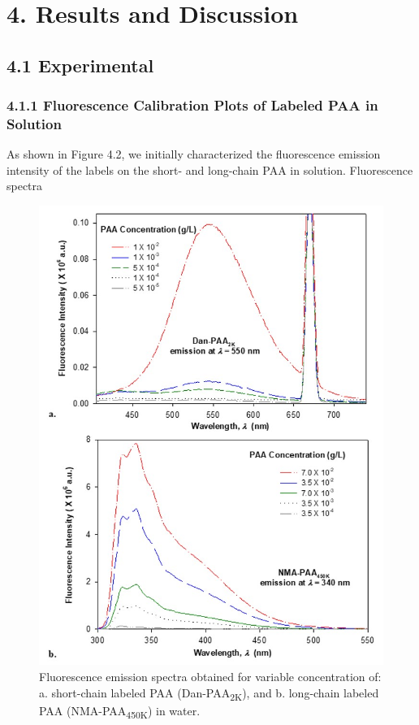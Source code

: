 \documentclass[journal=mamobx,manuscript=article]{achemso}
\begin{document}
\section{4. Results and Discussion}

\subsection{4.1 Experimental}

\subsubsection{4.1.1 Fluorescence Calibration Plots of Labeled PAA in Solution}

As shown in Figure 4.2, we initially characterized the fluorescence emission intensity of the labels on the short- and long-chain PAA in solution.  Fluorescence spectra

\begin{figure}[H]
\includegraphics[scale=0.65]{Slide1.jpg}
\caption{Fluorescence emission spectra obtained for variable concentration of: a. short-chain labeled PAA (Dan-PAA\textsubscript{2K}), and b. long-chain labeled PAA (NMA-PAA\textsubscript{450K}) in water.}
\label{figure 2}
\end{figure}
\end{document}
